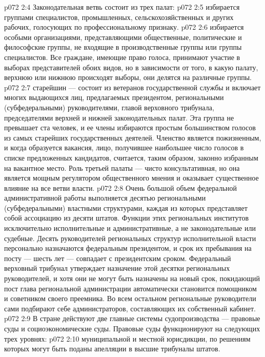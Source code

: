 \vs p072 2:4 \pc Законодательная ветвь состоит из трех палат:
\vs p072 2:5 \bibnobreakspace {} избирается группами специалистов, промышленных, сельскохозяйственных и других рабочих, голосующих по профессиональному признаку.
\vs p072 2:6 \bibnobreakspace {} избирается особыми организациями, представляющими общественные, политические и философские группы, не входящие в производственные группы или группы специалистов. Все граждане, имеющие право голоса, принимают участие в выборах представителей обоих видов, но в зависимости от того, в какую палату, верхнюю или нижнюю происходят выборы, они делятся на различные группы.
\vs p072 2:7 \bibnobreakspace {} старейшин --- состоит из ветеранов государственной службы и включает многих выдающихся лиц, предлагаемых президентом, региональными (субфедеральными) руководителями, главой верховного трибунала, председателями верхней и нижней законодательных палат. Эта группа не превышает ста человек, и ее члены избираются простым большинством голосов из самых старейших государственных деятелей. Членство является пожизненным, и когда образуется вакансия, лицо, получившее наибольшее число голосов в списке предложенных кандидатов, считается, таким образом, законно избранным на вакантное место. Роль третьей палаты --- чисто консультативная, но она является мощным регулятором общественного мнения и оказывает существенное влияние на все ветви власти.
\vs p072 2:8 \pc Очень большой объем федеральной административной работы выполняется десятью региональными (субфедеральными) властными структурами, каждая из которых представляет собой ассоциацию из десяти штатов. Функции этих региональных институтов исключительно исполнительные и административные, а не законодательные или судебные. Десять руководителей региональных структур исполнительной власти персонально назначаются федеральным президентом, и срок их пребывания на посту --- шесть лет --- совпадает с президентским сроком. Федеральный верховный трибунал утверждает назначение этой десятки региональных руководителей, и хотя они не могут быть назначены на новый срок, покидающий пост глава региональной администрации автоматически становится помощником и советником своего преемника. Во всем остальном региональные руководители сами подбирают себе администраторов, составляющих их собственный кабинет.
\vs p072 2:9 \pc В стране действуют две главные системы судопроизводства --- правовые суды и социоэкономические суды. Правовые суды функционируют на следующих трех уровнях:
\vs p072 2:10 \bibnobreakspace {} муниципальной и местной юрисдикции, по решениям которых могут быть поданы апелляции в высшие трибуналы штатов.
